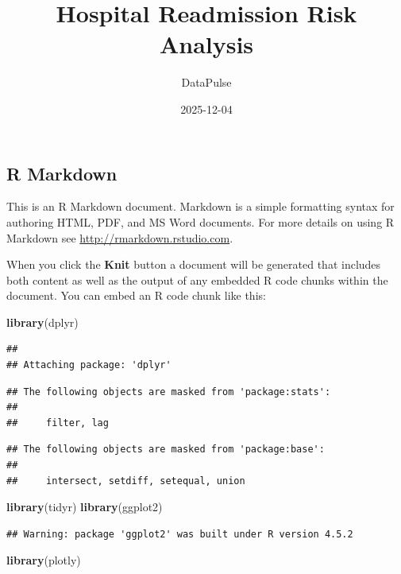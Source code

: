 \documentclass[
]{article}
\title{Hospital Readmission Risk Analysis}
\author{DataPulse}
\date{2025-12-04}
\newenvironment{Shaded}{\begin{snugshade}}{\end{snugshade}}
\newcommand{\FunctionTok}[1]{\textcolor[rgb]{0.13,0.29,0.53}{\textbf{#1}}}
\newcommand{\NormalTok}[1]{#1}
\begin{document}
\maketitle

\subsection{R Markdown}\label{r-markdown}

This is an R Markdown document. Markdown is a simple formatting syntax
for authoring HTML, PDF, and MS Word documents. For more details on
using R Markdown see \url{http://rmarkdown.rstudio.com}.

When you click the \textbf{Knit} button a document will be generated
that includes both content as well as the output of any embedded R code
chunks within the document. You can embed an R code chunk like this:

\begin{Shaded}
\begin{Highlighting}[]
\FunctionTok{library}\NormalTok{(dplyr)}
\end{Highlighting}
\end{Shaded}

\begin{verbatim}
## 
## Attaching package: 'dplyr'
\end{verbatim}

\begin{verbatim}
## The following objects are masked from 'package:stats':
## 
##     filter, lag
\end{verbatim}

\begin{verbatim}
## The following objects are masked from 'package:base':
## 
##     intersect, setdiff, setequal, union
\end{verbatim}

\begin{Shaded}
\begin{Highlighting}[]
\FunctionTok{library}\NormalTok{(tidyr)}
\FunctionTok{library}\NormalTok{(ggplot2)}
\end{Highlighting}
\end{Shaded}

\begin{verbatim}
## Warning: package 'ggplot2' was built under R version 4.5.2
\end{verbatim}

\begin{Shaded}
\begin{Highlighting}[]
\FunctionTok{library}\NormalTok{(plotly)}
\end{Highlighting}
\end{Shaded}
\end{document}
